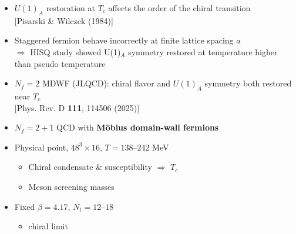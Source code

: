 \documentclass[10pt, aspectratio=169]{beamer} %
\begin{document}
\begin{frame}
\fontsize{11pt}{16pt}\selectfont
\vfill
\begin{itemize}
\setlength{\itemsep}{0.9em}
\item $U(1)_A$ restoration at $T_c$ affects the order of the chiral transition \\
      {\scriptsize [Pisarski \& Wilczek (1984)]}
\item Staggered fermion behave incorrectly at finite lattice spacing $a$ \\
    $\Rightarrow$ HISQ study showed U(1)$_A$ symmetry restored at temperature higher than pseudo temperature 
\item $N_f = 2$ MDWF (JLQCD): chiral flavor and $U(1)_A$ symmetry both restored near $T_c$ \\
      {\scriptsize [Phys. Rev. D \textbf{111}, 114506 (2025)]}
\end{itemize}
\vfill
\end{frame}

\begin{frame}
\vfill
{}
\fontsize{11pt}{16pt}\selectfont
\begin{itemize}
\setlength{\itemsep}{0.8em}
\item $N_f = 2+1$ QCD with\textbf{  Möbius domain-wall fermions}
\item Physical point, $48^3 \times 16$, $T = 138$--$242$ MeV
  \begin{itemize}
    \item Chiral condensate \& susceptibility $\Rightarrow$ $T_{c}$
    \item Meson screening masses 
  \end{itemize}
\item Fixed $\beta = 4.17$, $N_t = 12$--$18$ 
    \begin{itemize}
    \item chiral limit 
  \end{itemize}
\end{itemize}
\vfill
\end{frame}
\end{document}
